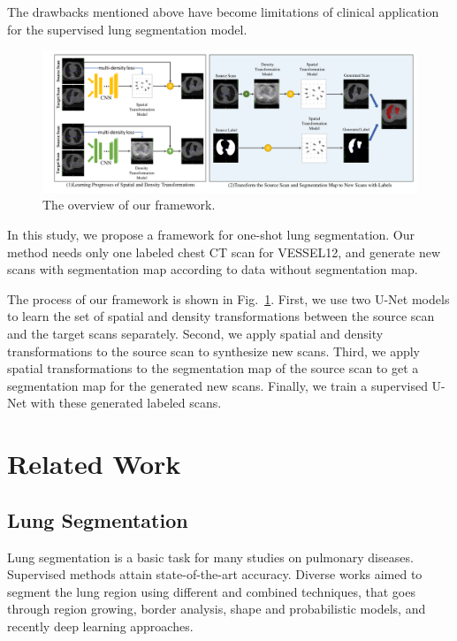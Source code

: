 \documentclass{article}
\begin{document}
The drawbacks mentioned above have become limitations of clinical application for the supervised lung segmentation model.


\begin{figure}[t]
    \centerline{\includegraphics[width=180mm]{transarti2.pdf}}
    \vspace{-0cm}
    \caption{The overview of our framework.
    }
    \vspace{-0cm}
    \label{transarti}
    \end{figure}


In this study, we propose a framework for one-shot lung segmentation. Our method needs only one labeled chest CT scan for VESSEL12, and generate new scans with segmentation map according to data without segmentation map.

The process of our framework is shown in Fig.~\ref{transarti}.
First, we use two U-Net models to learn the set of spatial and density transformations between the source scan and the target scans separately. Second, we apply spatial and density transformations to the source scan to synthesize new scans. Third, we apply spatial transformations to the segmentation map of the source scan to get a segmentation map for the generated new scans. Finally, we train a supervised U-Net with these generated labeled scans.


\section{Related Work}
\label{sec:related}
\subsection{Lung Segmentation}
Lung segmentation is a basic task for many studies on pulmonary diseases. Supervised methods attain state-of-the-art accuracy. Diverse works aimed to segment the lung region using different and combined techniques, that goes through region growing, border analysis, shape and probabilistic models, and recently deep learning approaches. 
\end{document}
